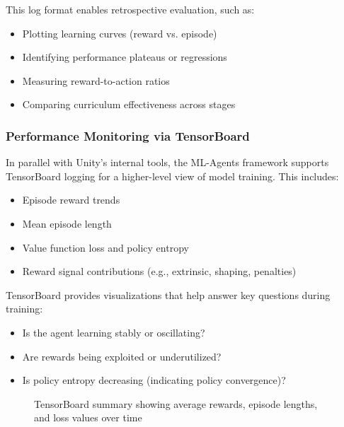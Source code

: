 \documentclass[12pt,oneside,openright,a4paper]{cpe-english-project}
\begin{document}
This log format enables retrospective evaluation, such as:

\begin{itemize}
\item Plotting learning curves (reward vs. episode)
\item Identifying performance plateaus or regressions
\item Measuring reward-to-action ratios
\item Comparing curriculum effectiveness across stages
\end{itemize}

\subsubsection{Performance Monitoring via TensorBoard}

In parallel with Unity’s internal tools, the ML-Agents framework supports TensorBoard logging for a higher-level view of model training. This includes:

\begin{itemize}
\item Episode reward trends
\item Mean episode length
\item Value function loss and policy entropy
\item Reward signal contributions (e.g., extrinsic, shaping, penalties)
\end{itemize}

TensorBoard provides visualizations that help answer key questions during training:

\begin{itemize}
\item Is the agent learning stably or oscillating?
\item Are rewards being exploited or underutilized?
\item Is policy entropy decreasing (indicating policy convergence)?
\end{itemize}

\begin{figure}[H]
\centering
{}
\caption{TensorBoard summary showing average rewards, episode lengths, and loss values over time}
\label{fig:TensorBoardExample}
\end{figure}
\end{document}
